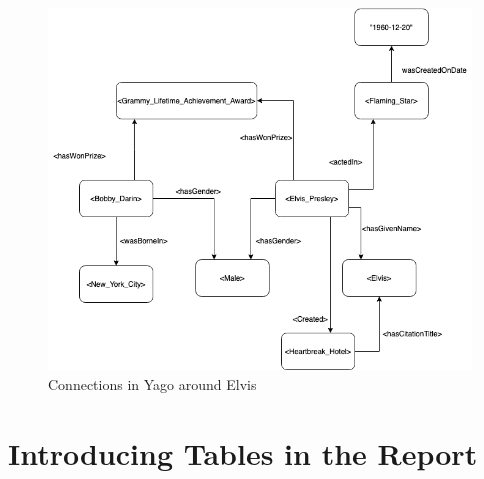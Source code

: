 \begin{figure}[t]
  \centering
  \includegraphics[scale=0.5]{figs/yagoExample.png}
 \caption{Connections in Yago around Elvis}
 \label{fig:Elvis}
\end{figure}

\section{Introducing Tables in the Report}

\glsresetall
